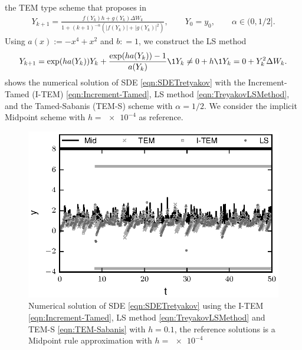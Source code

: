 \documentclass[sort&compress, preprint]{elsarticle}
\theoremstyle{definition}
\theoremstyle{plain}%
\theoremstyle{remark}
\newcommand{\SM}{LS\xspace}
\begin{document}
	the TEM type scheme that proposes \citeauthor{Sabanis2013} in \cite{Sabanis2013}
	\begin{align}\label{eqn:TEM-Sabanis}
		Y_{k+1} = 
			\frac{
					f(Y_k) h + g(Y_k) \Delta W_k}
				{1 + (k+1)^{-\alpha}\left( |f(Y_k)|  + |g(Y_k)|^2\right)}, 
				\qquad Y_0 = y_0, 
				\qquad \alpha \in (0,1/2].
	\end{align}
	Using $a(x):= -x^4 +x^2$ and $b: = 1$, we construct the \SM method
	\begin{equation}\label{eqn:TreyakovLSMethod}
		Y_{k+1} = \exp(ha(Y_k))Y_k + 
		\frac{\exp(ha(Y_k)) - 1}{a(Y_k)} \1{Y_k\neq 0}
		+h\1{Y_k=0}
		+Y_k^2\Delta W_k. 		
	\end{equation}
	 shows the numerical solution of SDE \eqref{eqn:SDETretyakov} with the Increment-Tamed (I-TEM) 
	\eqref{eqn:Increment-Tamed}, \SM method \eqref{eqn:TreyakovLSMethod}, and the Tamed-Sabanis (TEM-S) scheme with 
	$\alpha=1/2$. 
	We consider the implicit Midpoint scheme \cite[Eq.(5.3)]{Tretyakov2013} with $h=\num{e-4}$ 
	as reference.
	\begin{figure}[h!]
		\centering
		\includegraphics{Tretyakov}
		\caption{
			Numerical solution of SDE \eqref{eqn:SDETretyakov} using the I-TEM 
			\eqref{eqn:Increment-Tamed}, \SM method \eqref{eqn:TreyakovLSMethod}  and TEM-S \eqref{eqn:TEM-Sabanis}
			with $h=\num{0.1}$, the reference solutions is a Midpoint rule approximation with $h=\num{e-4}$
			}
		\label{fig:Tretyakov}
	\end{figure}
\end{document}
